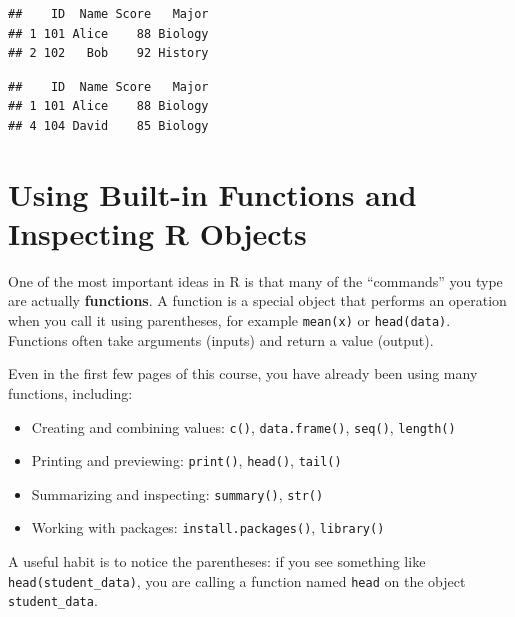\documentclass[
  11pt,
]{article}
\newenvironment{Shaded}{\begin{snugshade}}{\end{snugshade}}
\newcommand{\CommentTok}[1]{\textcolor[rgb]{0.56,0.35,0.01}{\textit{#1}}}
\newcommand{\FunctionTok}[1]{\textcolor[rgb]{0.13,0.29,0.53}{\textbf{#1}}}
\newcommand{\NormalTok}[1]{#1}
\newcommand{\OtherTok}[1]{\textcolor[rgb]{0.56,0.35,0.01}{#1}}
\newcommand{\SpecialCharTok}[1]{\textcolor[rgb]{0.81,0.36,0.00}{\textbf{#1}}}
\newcommand{\StringTok}[1]{\textcolor[rgb]{0.31,0.60,0.02}{#1}}
\providecommand{\tightlist}{%
  \setlength{\itemsep}{0pt}\setlength{\parskip}{0pt}}
\begin{document}
\begin{verbatim}
##    ID  Name Score   Major
## 1 101 Alice    88 Biology
## 2 102   Bob    92 History
\end{verbatim}

\begin{Shaded}
\end{Shaded}

\begin{verbatim}
##    ID  Name Score   Major
## 1 101 Alice    88 Biology
## 4 104 David    85 Biology
\end{verbatim}

\section{Using Built-in Functions and Inspecting R
Objects}\label{using-built-in-functions-and-inspecting-r-objects}

One of the most important ideas in R is that many of the ``commands''
you type are actually \textbf{functions}. A function is a special object
that performs an operation when you call it using parentheses, for
example \texttt{mean(x)} or \texttt{head(data)}. Functions often take
arguments (inputs) and return a value (output).

Even in the first few pages of this course, you have already been using
many functions, including:

\begin{itemize}
\tightlist
\item
  Creating and combining values: \texttt{c()}, \texttt{data.frame()},
  \texttt{seq()}, \texttt{length()}
\item
  Printing and previewing: \texttt{print()}, \texttt{head()},
  \texttt{tail()}
\item
  Summarizing and inspecting: \texttt{summary()}, \texttt{str()}
\item
  Working with packages: \texttt{install.packages()}, \texttt{library()}
\end{itemize}

A useful habit is to notice the parentheses: if you see something like
\texttt{head(student\_data)}, you are calling a function named
\texttt{head} on the object \texttt{student\_data}.
\end{document}

